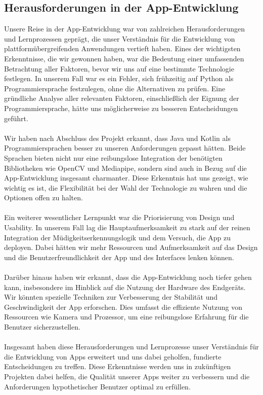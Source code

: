 \subsection{Herausforderungen in der App-Entwicklung}
	\label{ssec:llentwicklung}
	
	Unsere Reise in der App-Entwicklung war von zahlreichen Herausforderungen und Lernprozessen geprägt, die unser Verständnis für die Entwicklung von plattformübergreifenden Anwendungen vertieft haben. Eines der wichtigsten Erkenntnisse, die wir gewonnen haben, war die Bedeutung einer umfassenden Betrachtung aller Faktoren, bevor wir uns auf eine bestimmte Technologie festlegen. In unserem Fall war es ein Fehler, sich frühzeitig auf Python als Programmiersprache festzulegen, ohne die Alternativen zu prüfen. Eine gründliche Analyse aller relevanten Faktoren, einschließlich der Eignung der Programmiersprache, hätte uns möglicherweise zu besseren Entscheidungen geführt.
	\\\\
	Wir haben nach Abschluss des Projekt erkannt, dass Java und Kotlin als Programmiersprachen besser zu unseren Anforderungen gepasst hätten. Beide Sprachen bieten nicht nur eine reibungslose Integration der benötigten Bibliotheken wie OpenCV und Mediapipe, sondern sind auch in Bezug auf die App-Entwicklung insgesamt charmanter. Diese Erkenntnis hat uns gezeigt, wie wichtig es ist, die Flexibilität bei der Wahl der Technologie zu wahren und die Optionen offen zu halten.
	\\\\
	Ein weiterer wesentlicher Lernpunkt war die Priorisierung von Design und Usability. In unserem Fall lag die Hauptaufmerksamkeit zu stark auf der reinen Integration der Müdigkeitserkennungslogik und dem Versuch, die App zu deployen. Dabei hätten wir mehr Ressourcen und Aufmerksamkeit auf das Design und die Benutzerfreundlichkeit der App und des Interfaces lenken können. 
	\\\\
	Darüber hinaus haben wir erkannt, dass die App-Entwicklung noch tiefer gehen kann, insbesondere im Hinblick auf die Nutzung der Hardware des Endgeräts. Wir könnten spezielle Techniken zur Verbesserung der Stabilität und Geschwindigkeit der App erforschen. Dies umfasst die effiziente Nutzung von Ressourcen wie Kamera und Prozessor, um eine reibungslose Erfahrung für die Benutzer sicherzustellen.
	\\\\
	Insgesamt haben diese Herausforderungen und Lernprozesse unser Verständnis für die Entwicklung von Apps erweitert und uns dabei geholfen, fundierte Entscheidungen zu treffen. Diese Erkenntnisse werden uns in zukünftigen Projekten dabei helfen, die Qualität unserer Apps weiter zu verbessern und die Anforderungen hypothetischer Benutzer optimal zu erfüllen.
	
